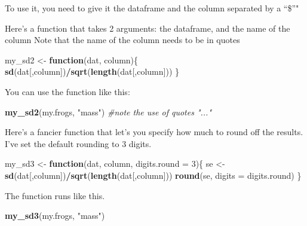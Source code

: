 \documentclass[]{book}
\newenvironment{Shaded}{\begin{snugshade}}{\end{snugshade}}
\newcommand{\KeywordTok}[1]{\textcolor[rgb]{0.13,0.29,0.53}{\textbf{#1}}}
\newcommand{\DataTypeTok}[1]{\textcolor[rgb]{0.13,0.29,0.53}{#1}}
\newcommand{\DecValTok}[1]{\textcolor[rgb]{0.00,0.00,0.81}{#1}}
\newcommand{\StringTok}[1]{\textcolor[rgb]{0.31,0.60,0.02}{#1}}
\newcommand{\CommentTok}[1]{\textcolor[rgb]{0.56,0.35,0.01}{\textit{#1}}}
\newcommand{\ControlFlowTok}[1]{\textcolor[rgb]{0.13,0.29,0.53}{\textbf{#1}}}
\newcommand{\OperatorTok}[1]{\textcolor[rgb]{0.81,0.36,0.00}{\textbf{#1}}}
\newcommand{\NormalTok}[1]{#1}
\theoremstyle{definition}
\theoremstyle{definition}
\theoremstyle{definition}
\theoremstyle{remark}
\begin{document}
To use it, you need to give it the dataframe and the column separated by
a ``\$''"

\begin{Shaded}
\end{Shaded}

Here's a function that takes 2 arguments: the dataframe, and the name of
the column Note that the name of the column needs to be in quotes

\begin{Shaded}
\begin{Highlighting}[]
\NormalTok{my_sd2 <-}\StringTok{ }\ControlFlowTok{function}\NormalTok{(dat, column)\{}
  \KeywordTok{sd}\NormalTok{(dat[,column])}\OperatorTok{/}\KeywordTok{sqrt}\NormalTok{(}\KeywordTok{length}\NormalTok{(dat[,column]))}
\NormalTok{\}}
\end{Highlighting}
\end{Shaded}

You can use the function like this:

\begin{Shaded}
\begin{Highlighting}[]
\KeywordTok{my_sd2}\NormalTok{(my.frogs, }\StringTok{"mass"}\NormalTok{) }\CommentTok{#note the use of quotes "..."}
\end{Highlighting}
\end{Shaded}

Here's a fancier function that let's you specify how much to round off
the results. I've set the default rounding to 3 digits.

\begin{Shaded}
\begin{Highlighting}[]
\NormalTok{my_sd3 <-}\StringTok{ }\ControlFlowTok{function}\NormalTok{(dat, column, }\DataTypeTok{digits.round =} \DecValTok{3}\NormalTok{)\{}
\NormalTok{  se <-}\StringTok{ }\KeywordTok{sd}\NormalTok{(dat[,column])}\OperatorTok{/}\KeywordTok{sqrt}\NormalTok{(}\KeywordTok{length}\NormalTok{(dat[,column]))}
  \KeywordTok{round}\NormalTok{(se, }\DataTypeTok{digits =}\NormalTok{ digits.round)}
\NormalTok{\}}
\end{Highlighting}
\end{Shaded}

The function runs like this.

\begin{Shaded}
\begin{Highlighting}[]
\KeywordTok{my_sd3}\NormalTok{(my.frogs, }\StringTok{"mass"}\NormalTok{)}
\end{Highlighting}
\end{Shaded}
\end{document}

